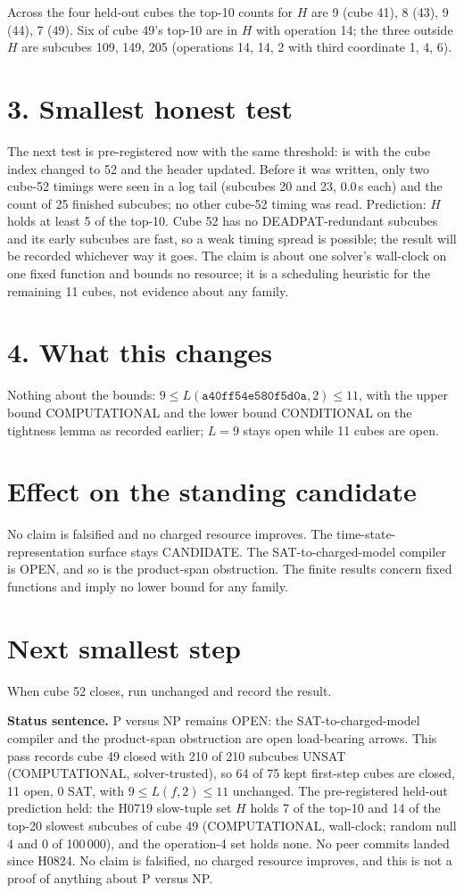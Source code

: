 \documentclass[11pt]{article}
\begin{document}
Across the four held-out cubes the top-10 counts for $H$ are 9 (cube 41), 8 (43), 9 (44), 7 (49). Six of cube 49's top-10 are in $H$ with operation 14; the three outside $H$ are subcubes 109, 149, 205 (operations 14, 14, 2 with third coordinate 1, 4, 6).

\section*{3. Smallest honest test}
The next test is pre-registered now with the same threshold:  is  with the cube index changed to 52 and the header updated. Before it was written, only two cube-52 timings were seen in a log tail (subcubes 20 and 23, 0.0\,s each) and the count of 25 finished subcubes; no other cube-52 timing was read. Prediction: $H$ holds at least 5 of the top-10. Cube 52 has no DEADPAT-redundant subcubes and its early subcubes are fast, so a weak timing spread is possible; the result will be recorded whichever way it goes. The claim is about one solver's wall-clock on one fixed function and bounds no resource; it is a scheduling heuristic for the remaining 11 cubes, not evidence about any family.

\section*{4. What this changes}
Nothing about the bounds: $9\le L(\texttt{a40ff54e580f5d0a},2)\le 11$, with the upper bound COMPUTATIONAL and the lower bound CONDITIONAL on the tightness lemma as recorded earlier; $L=9$ stays open while 11 cubes are open.

\section*{Effect on the standing candidate}
No claim is falsified and no charged resource improves. The time-state-representation surface stays CANDIDATE. The SAT-to-charged-model compiler is OPEN, and so is the product-span obstruction. The finite results concern fixed functions and imply no lower bound for any family.

\section*{Next smallest step}
When cube 52 closes, run  unchanged and record the result.

\bigskip
\noindent\textbf{Status sentence.} P versus NP remains OPEN: the SAT-to-charged-model compiler and the product-span obstruction are open load-bearing arrows. This pass records cube 49 closed with 210 of 210 subcubes UNSAT (COMPUTATIONAL, solver-trusted), so 64 of 75 kept first-step cubes are closed, 11 open, 0 SAT, with $9\le L(f,2)\le 11$ unchanged. The pre-registered held-out prediction held: the H0719 slow-tuple set $H$ holds 7 of the top-10 and 14 of the top-20 slowest subcubes of cube 49 (COMPUTATIONAL, wall-clock; random null 4 and 0 of 100\,000), and the operation-4 set holds none. No peer commits landed since H0824. No claim is falsified, no charged resource improves, and this is not a proof of anything about P versus NP.
\end{document}
